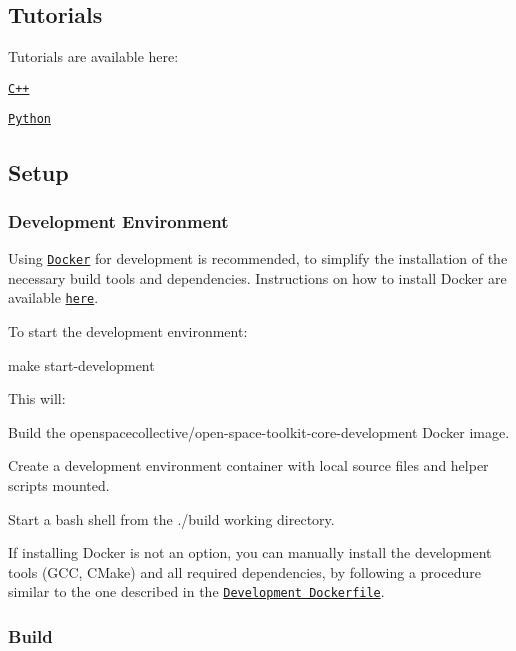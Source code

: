 \subsection*{Tutorials}

Tutorials are available here\+:


\begin{DoxyItemize}
\item \href{./tutorials/cpp}{\tt C++}
\item \href{./tutorials/python}{\tt Python}
\end{DoxyItemize}

\subsection*{Setup}

\subsubsection*{Development Environment}

Using \href{https://www.docker.com}{\tt Docker} for development is recommended, to simplify the installation of the necessary build tools and dependencies. Instructions on how to install Docker are available \href{https://docs.docker.com/install/}{\tt here}.

To start the development environment\+:


\begin{DoxyCode}
make start-development
\end{DoxyCode}


This will\+:


\begin{DoxyEnumerate}
\item Build the {\ttfamily openspacecollective/open-\/space-\/toolkit-\/core-\/development} Docker image.
\item Create a development environment container with local source files and helper scripts mounted.
\item Start a {\ttfamily bash} shell from the {\ttfamily ./build} working directory.
\end{DoxyEnumerate}

If installing Docker is not an option, you can manually install the development tools (G\+CC, C\+Make) and all required dependencies, by following a procedure similar to the one described in the \href{./docker/development/Dockerfile}{\tt Development Dockerfile}.

\subsubsection*{Build}


